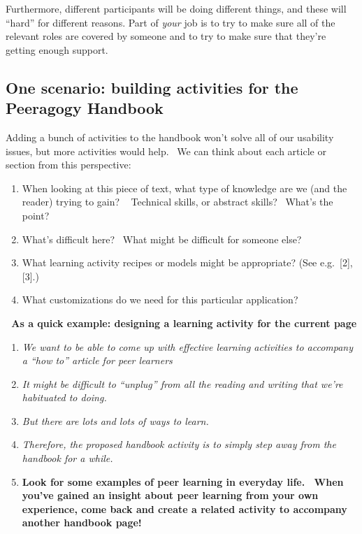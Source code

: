 Furthermore, different participants will be doing different things,
and these will ``hard'' for different reasons.  Part of \emph{your}
job is to try to make sure all of the relevant roles are covered by
someone and to try to make sure that they're getting enough
support.

\subsection{One scenario: building activities for the Peeragogy
Handbook}

Adding a bunch of activities to the handbook won't solve all of our
usability issues, but more activities would help.~ We can think about
each article or section from this perspective:

\begin{enumerate}
\itemsep1pt\parskip0pt
\item
  When looking at this piece of text, what type of knowledge are we (and
  the reader) trying to gain? ~ Technical skills, or abstract skills?~
  What's the point?
\item
  What's difficult here? ~What might be difficult for someone else?
\item
  What learning activity recipes or models might be appropriate? (See
  e.g.~{[}2{]}, {[}3{]}.)
\item
  What customizations do we need for this particular application?
\end{enumerate}

\noindent\textbf{\emph{~}As a quick example: designing a learning activity for
the current page}

\begin{enumerate}
\item
  \emph{We want to be able to come up with effective learning
  activities to accompany a ``how to'' article for peer
  learners}
\item
  \emph{It might be difficult to ``unplug'' from all the reading and
  writing that we're habituated to doing.}
\item \emph{But there are lots and lots of ways to learn.}
\item
  \emph{Therefore, the proposed handbook activity is to simply step away from the
  handbook for a while.}
\item[] \textbf{Look for some examples of peer learning in
  everyday life.~ When you've gained an insight about peer learning
  from your own experience, come back and create a related activity to
  accompany another handbook page!}
\end{enumerate}

